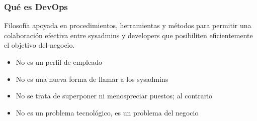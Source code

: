 \begin{frame}
  \frametitle{Qué es DevOps}
  \begin{center}
    Filosofía apoyada en procedimientos, herramientas y métodos para permitir una colaboración efectiva entre sysadmins y developers que posibiliten eficientemente el objetivo del negocio.
  \end{center}
  \begin{itemize}
    \item No es un perfil de empleado
    \item No es una nueva forma de llamar a los sysadmins
    \item No se trata de superponer ni menospreciar puestos; al contrario
    \item No es un problema tecnológico, es un problema del negocio
  \end{itemize}
\end{frame}
